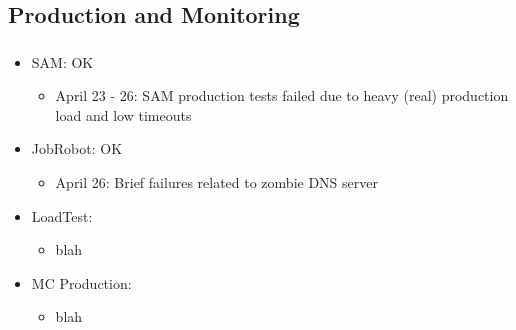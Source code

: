 \documentclass{beamer}
\begin{document}
\subsection{Production and Monitoring}
\begin{frame}
\frametitle{}
\begin{itemize}
    \item SAM: OK
    \begin{itemize}
        \item April 23 - 26: SAM production tests failed due to heavy (real) production load and low timeouts
    \end{itemize}
    \item JobRobot: OK 
    \begin{itemize}
        \item April 26: Brief failures related to zombie DNS server
    \end{itemize}
    \item LoadTest:
    \begin{itemize}
        \item blah
    \end{itemize}
    \item MC Production:
    \begin{itemize}
        \item blah
    \end{itemize}
\end{itemize}
\end{frame}
\end{document}
